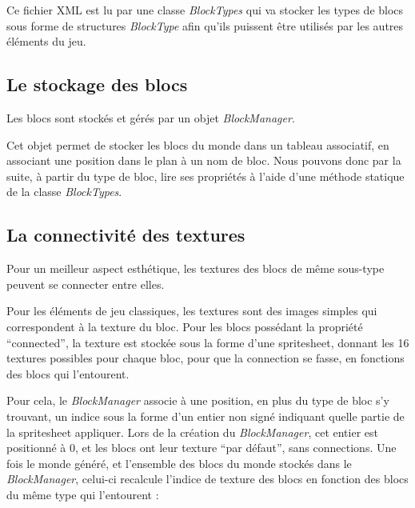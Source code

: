 \documentclass[10pt]{report}
\begin{document}
Ce fichier XML est lu par une classe \emph{BlockTypes} qui va stocker les types de blocs sous forme de structures \emph{BlockType} afin qu'ils puissent être utilisés par les autres éléments du jeu.
  
\subsection{Le stockage des blocs}

Les blocs sont stockés et gérés par un objet \emph{BlockManager}.

Cet objet permet de stocker les blocs du monde dans un tableau associatif, en associant une position dans le plan à un nom de bloc.
Nous pouvons donc par la suite, à partir du type de bloc, lire ses propriétés à l'aide d'une méthode statique de la classe \emph{BlockTypes}.

\subsection{La connectivité des textures}

Pour un meilleur aspect esthétique, les textures des blocs de même sous-type peuvent se connecter entre elles.

Pour les éléments de jeu classiques, les textures sont des images simples qui correspondent à la texture du bloc.
Pour les blocs possédant la propriété ``connected'', la texture est stockée sous la forme d'une spritesheet,
donnant les 16 textures possibles pour chaque bloc, pour que la connection se fasse, en fonctions des blocs qui l'entourent.

Pour cela, le \emph{BlockManager} associe à une position, en plus du type de bloc s'y trouvant, un indice sous la
forme d'un entier non signé indiquant quelle partie de la spritesheet appliquer.
Lors de la création du \emph{BlockManager}, cet entier est positionné à 0, et les blocs ont leur texture ``par défaut'', sans connections.
Une fois le monde généré, et l'ensemble des blocs du monde stockés dans le \emph{BlockManager}, celui-ci recalcule l'indice de texture des blocs en fonction des blocs du même type qui l'entourent :
\end{document}
